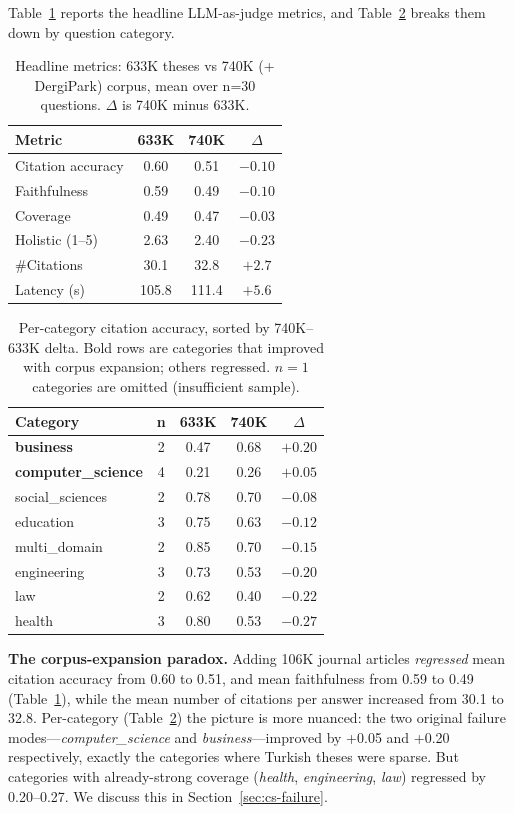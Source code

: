 \documentclass[conference]{IEEEtran}
\begin{document}
Table~\ref{tab:overall} reports the headline LLM-as-judge metrics, and
Table~\ref{tab:bycat} breaks them down by question category.

\begin{table}[t]
\centering
\caption{Headline metrics: 633K theses vs 740K (+ DergiPark) corpus, mean
over n=30 questions. $\Delta$ is 740K minus 633K.}
\label{tab:overall}
\begin{tabular}{lccc}
\toprule
Metric & 633K & 740K & $\Delta$ \\
\midrule
Citation accuracy & 0.60 & 0.51 & $-0.10$ \\
Faithfulness      & 0.59 & 0.49 & $-0.10$ \\
Coverage          & 0.49 & 0.47 & $-0.03$ \\
Holistic (1--5)   & 2.63 & 2.40 & $-0.23$ \\
\#Citations       & 30.1 & 32.8 & $+2.7$ \\
Latency (s)       & 105.8& 111.4& $+5.6$ \\
\bottomrule
\end{tabular}
\end{table}

\begin{table}[t]
\centering
\caption{Per-category citation accuracy, sorted by 740K--633K delta.
Bold rows are categories that improved with corpus expansion;
others regressed. $n=1$ categories are omitted (insufficient sample).}
\label{tab:bycat}
\begin{tabular}{lcccc}
\toprule
Category & n & 633K & 740K & $\Delta$ \\
\midrule
\textbf{business}        & 2 & 0.47 & 0.68 & $+0.20$ \\
\textbf{computer\_science}& 4 & 0.21 & 0.26 & $+0.05$ \\
\midrule
social\_sciences         & 2 & 0.78 & 0.70 & $-0.08$ \\
education                & 3 & 0.75 & 0.63 & $-0.12$ \\
multi\_domain            & 2 & 0.85 & 0.70 & $-0.15$ \\
engineering              & 3 & 0.73 & 0.53 & $-0.20$ \\
law                      & 2 & 0.62 & 0.40 & $-0.22$ \\
health                   & 3 & 0.80 & 0.53 & $-0.27$ \\
\bottomrule
\end{tabular}
\end{table}

\textbf{The corpus-expansion paradox.} Adding 106K journal articles
\emph{regressed} mean citation accuracy from 0.60 to 0.51, and mean
faithfulness from 0.59 to 0.49 (Table~\ref{tab:overall}), while the
mean number of citations per answer increased from 30.1 to 32.8.
Per-category (Table~\ref{tab:bycat}) the picture is more nuanced:
the two original failure modes---\emph{computer\_science} and
\emph{business}---improved by +0.05 and +0.20 respectively, exactly
the categories where Turkish theses were sparse. But categories with
already-strong coverage (\emph{health}, \emph{engineering}, \emph{law})
regressed by 0.20--0.27. We discuss this in Section~\ref{sec:cs-failure}.
\end{document}
